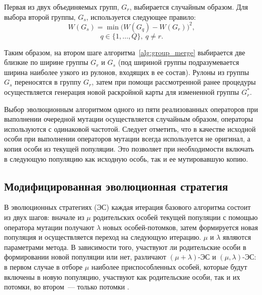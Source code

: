 \documentclass[12pt]{article}
\begin{document}
Первая из двух объединяемых групп, $G_r$, выбирается случайным образом. 
Для выбора второй группы, $G_s$, используется следующее правило:
\[ W(G_s)=\min{\bigl( W(G_q) - W(G_r) \bigr)^2}, \]
\[ q \in \{1,\ldots,Q\}, \: q \neq r. \]

Таким образом, на втором шаге алгоритма~\ref{alg:group_merge}
выбирается две близкие по ширине группы $G_r$ и 
$G_s$ (под шириной группы подразумевается ширина наиболее узкого из рулонов, 
входящих в ее состав). Рулоны из группы $G_s$ переносятся в группу $G_r$, 
затем при помощи рассмотренной ранее процедуры осуществляется генерация новой 
раскройной карты для измененной группы $G_r^*$.

Выбор эволюционным алгоритмом одного из пяти реализованных операторов при 
выполнении очередной мутации осуществляется случайным образом, операторы 
используются с одинаковой частотой. Следует отметить, что в качестве исходной 
особи при выполнении операторов мутации всегда используется не оригинал, а 
копия особи из текущей популяции. Это позволяет при необходимости включать в 
следующую популяцию как исходную особь, так и ее мутировавшую копию.

\subsection{Модифицированная эволюционная стратегия}

В эволюционных стратегиях (ЭС) каждая итерация базового алгоритма состоит из 
двух шагов: вначале из $\mu$ родительских особей текущей популяции с помощью 
оператора мутации получают $\lambda$ новых особей-потомков, затем формируется 
новая популяция и осуществляется переход на следующую итерацию. $\mu$ и 
$\lambda$ являются параметрами метода. В зависимости того, участвуют ли 
родительские особи в формировании новой популяции или нет, различают 
$(\mu + \lambda)$-ЭС и $(\mu, \lambda)$-ЭС: в первом случае в отборе $\mu$ 
наиболее приспособленных особей, которые будут включены в новую популяцию, 
участвуют как родительские особи, так и их потомки, во втором~--- только 
потомки 
\cite{bib:schwefel95}. 
\end{document}

